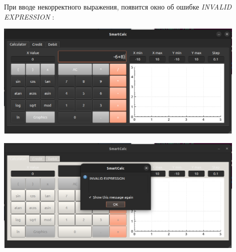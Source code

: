 \documentclass[12pt, letterpaper, twoside]{article}
\begin{document}
	\par При вводе некорректного выражения, появится окно об ошибке \textit{INVALID EXPRESSION} :
	\par \includegraphics[width=12cm]{4}
	\par \includegraphics[width=12cm]{5}
	
\end{document}
